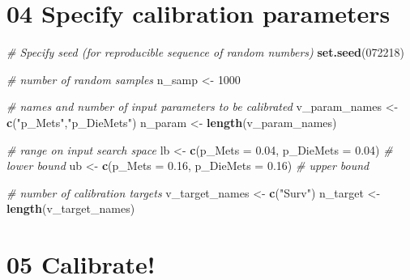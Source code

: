\documentclass[
]{article}
\newenvironment{Shaded}{\begin{snugshade}}{\end{snugshade}}
\newcommand{\CommentTok}[1]{\textcolor[rgb]{0.56,0.35,0.01}{\textit{#1}}}
\newcommand{\DataTypeTok}[1]{\textcolor[rgb]{0.13,0.29,0.53}{#1}}
\newcommand{\DecValTok}[1]{\textcolor[rgb]{0.00,0.00,0.81}{#1}}
\newcommand{\FloatTok}[1]{\textcolor[rgb]{0.00,0.00,0.81}{#1}}
\newcommand{\KeywordTok}[1]{\textcolor[rgb]{0.13,0.29,0.53}{\textbf{#1}}}
\newcommand{\NormalTok}[1]{#1}
\newcommand{\StringTok}[1]{\textcolor[rgb]{0.31,0.60,0.02}{#1}}
\begin{document}
\hypertarget{specify-calibration-parameters}{%
\section{04 Specify calibration
parameters}\label{specify-calibration-parameters}}

\begin{Shaded}
\begin{Highlighting}[]
\CommentTok{# Specify seed (for reproducible sequence of random numbers)}
\KeywordTok{set.seed}\NormalTok{(}\DecValTok{072218}\NormalTok{)}

\CommentTok{# number of random samples}
\NormalTok{n_samp <-}\StringTok{ }\DecValTok{1000}

\CommentTok{# names and number of input parameters to be calibrated}
\NormalTok{v_param_names <-}\StringTok{ }\KeywordTok{c}\NormalTok{(}\StringTok{"p_Mets"}\NormalTok{,}\StringTok{"p_DieMets"}\NormalTok{)}
\NormalTok{n_param <-}\StringTok{ }\KeywordTok{length}\NormalTok{(v_param_names)}

\CommentTok{# range on input search space}
\NormalTok{lb <-}\StringTok{ }\KeywordTok{c}\NormalTok{(}\DataTypeTok{p_Mets =} \FloatTok{0.04}\NormalTok{, }\DataTypeTok{p_DieMets =} \FloatTok{0.04}\NormalTok{) }\CommentTok{# lower bound}
\NormalTok{ub <-}\StringTok{ }\KeywordTok{c}\NormalTok{(}\DataTypeTok{p_Mets =} \FloatTok{0.16}\NormalTok{, }\DataTypeTok{p_DieMets =} \FloatTok{0.16}\NormalTok{) }\CommentTok{# upper bound}

\CommentTok{# number of calibration targets}
\NormalTok{v_target_names <-}\StringTok{ }\KeywordTok{c}\NormalTok{(}\StringTok{"Surv"}\NormalTok{)}
\NormalTok{n_target <-}\StringTok{ }\KeywordTok{length}\NormalTok{(v_target_names)}
\end{Highlighting}
\end{Shaded}

\hypertarget{calibrate}{%
\section{05 Calibrate!}\label{calibrate}}
\end{document}
